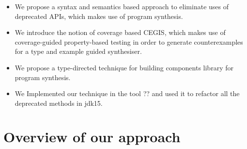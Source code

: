 \documentclass[runningheads,a4paper]{llncs}
\begin{document}
\begin{itemize}

\item We propose a syntax and semantics based approach to eliminate uses of deprecated APIs, which makes use of program synthesis.

\item We introduce the notion of coverage based CEGIS, which makes use of coverage-guided property-based testing in order to generate counterexamples for a type and example guided synthesiser.

\item We propose a type-directed technique for building components library for program synthesis.
  


\item We Implemented our technique in the tool ?? and used it to refactor all the deprecated methods in jdk15.
  
\end{itemize}  

%



\section{Overview of our approach} \label{sec:approach}
\end{document}
